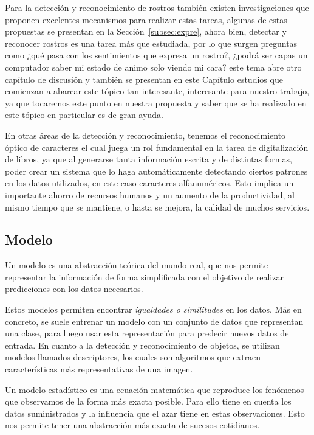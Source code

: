 Para la detección y reconocimiento de rostros también existen investigaciones que proponen excelentes mecanismos para realizar estas tareas, algunas de estas propuestas se presentan en la Sección~\ref{subsec:expre}, ahora bien, detectar y reconocer rostros es una tarea más que estudiada, por lo que surgen preguntas como ¿qué pasa con los sentimientos que expresa un rostro?, ¿podrá ser capas un computador saber mi estado de animo solo viendo mi cara? este tema abre otro capítulo de discusión y también se presentan en este Capítulo estudios que comienzan a abarcar este tópico tan interesante, interesante para nuestro trabajo, ya que tocaremos este punto en nuestra propuesta y saber que se ha realizado en este tópico en particular es de gran ayuda.

En otras áreas de la detección y reconocimiento, tenemos el reconocimiento óptico de caracteres el cual juega un rol fundamental en la tarea de digitalización de libros, ya que al generarse tanta información escrita y de distintas formas, poder crear un sistema que lo haga automáticamente detectando ciertos patrones en los datos utilizados, en este caso caracteres alfanuméricos. Esto implica un importante ahorro de recursos humanos y un aumento de la productividad, al mismo tiempo que se mantiene, o hasta se mejora, la calidad de muchos servicios.

\subsection{Modelo}
\label{subsec:modelo}

\begin{definition}[Modelo]
Un modelo es una abstracción teórica del mundo real, que nos permite representar la información de forma simplificada con el objetivo de realizar predicciones con los datos necesarios. 
\end{definition}

Estos modelos permiten encontrar \textit{igualdades o similitudes} en los datos. Más en concreto, se suele entrenar un modelo con un conjunto de datos que representan una clase, para luego usar esta representación para predecir nuevos datos de entrada. En cuanto a la detección y reconocimiento de objetos, se utilizan modelos llamados descriptores, los cuales son algoritmos que extraen características más representativas de una imagen. 

\begin{definition}\label{def:mod_est}
Un modelo estadístico es una ecuación matemática que reproduce los fenómenos que observamos de la forma más exacta posible. Para ello tiene en cuenta los datos suministrados y la influencia que el azar tiene en estas observaciones. Esto nos permite tener una abstracción más exacta de sucesos cotidianos.
\end{definition}
 
